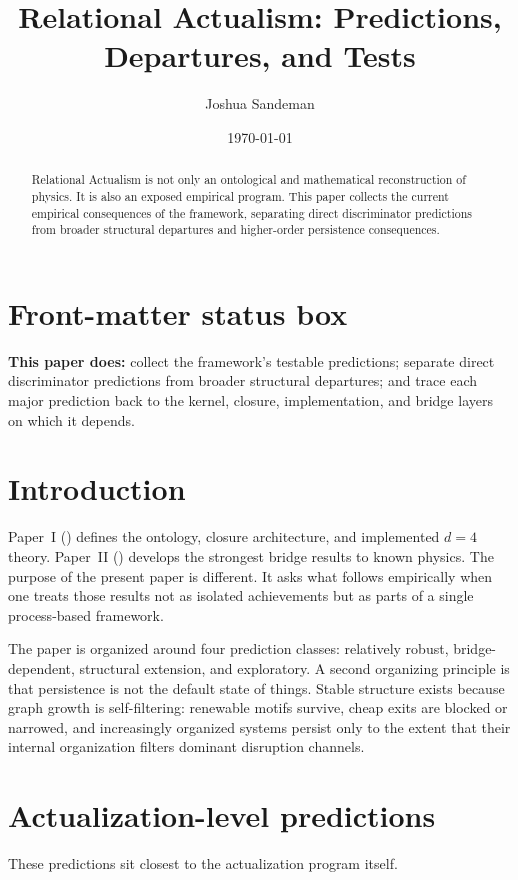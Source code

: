 \documentclass[11pt]{article}
\title{Relational Actualism: Predictions, Departures, and Tests}
\author{Joshua Sandeman}
\date{\today}
\begin{document}
\maketitle

\begin{abstract}
Relational Actualism is not only an ontological and mathematical reconstruction of physics. It is also an exposed empirical program. This paper collects the current empirical consequences of the framework, separating direct discriminator predictions from broader structural departures and higher-order persistence consequences.
\end{abstract}

\section*{Front-matter status box}
\noindent\textbf{This paper does:} collect the framework's testable predictions; separate direct discriminator predictions from broader structural departures; and trace each major prediction back to the kernel, closure, implementation, and bridge layers on which it depends.

\section{Introduction}
Paper~I (\cite{RAKernelPaper}) defines the ontology, closure architecture, and implemented $d=4$ theory. Paper~II (\cite{RABridgePaper}) develops the strongest bridge results to known physics. The purpose of the present paper is different. It asks what follows empirically when one treats those results not as isolated achievements but as parts of a single process-based framework.

The paper is organized around four prediction classes: relatively robust, bridge-dependent, structural extension, and exploratory. A second organizing principle is that persistence is not the default state of things. Stable structure exists because graph growth is self-filtering: renewable motifs survive, cheap exits are blocked or narrowed, and increasingly organized systems persist only to the extent that their internal organization filters dominant disruption channels.

\section{Actualization-level predictions}
These predictions sit closest to the actualization program itself.
\end{document}
